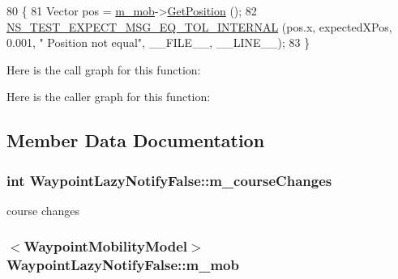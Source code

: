 \begin{DoxyCode}
80 \{
81   Vector pos = \hyperlink{classWaypointLazyNotifyFalse_acf8bb7f07cba4da3d83bab7bcc97094a}{m\_mob}->\hyperlink{classns3_1_1MobilityModel_aba838f06ec5bbb2d193d94b8c0e4abb4}{GetPosition} ();
82   \hyperlink{group__testingimpl_ga831cf7f3b988d2759f9c1b72f0a1bd5c}{NS\_TEST\_EXPECT\_MSG\_EQ\_TOL\_INTERNAL} (pos.x, expectedXPos, 0.001, \textcolor{stringliteral}{"
      Position not equal"}, \_\_FILE\_\_, \_\_LINE\_\_);
83 \}
\end{DoxyCode}


Here is the call graph for this function\+:




Here is the caller graph for this function\+:




\subsection{Member Data Documentation}
\subsubsection[{\texorpdfstring{m\+\_\+course\+Changes}{m_courseChanges}}]{\setlength{\rightskip}{0pt plus 5cm}int Waypoint\+Lazy\+Notify\+False\+::m\+\_\+course\+Changes\hspace{0.3cm}{\ttfamily [private]}}\hypertarget{classWaypointLazyNotifyFalse_a78f52b3733698debc6d133982de7ea56}{}\label{classWaypointLazyNotifyFalse_a78f52b3733698debc6d133982de7ea56}


course changes 

\subsubsection[{\texorpdfstring{m\+\_\+mob}{m_mob}}]{$<${\bf Waypoint\+Mobility\+Model}$>$ Waypoint\+Lazy\+Notify\+False\+::m\+\_\+mob\hspace{0.3cm}{\ttfamily [private]}}\hypertarget{classWaypointLazyNotifyFalse_acf8bb7f07cba4da3d83bab7bcc97094a}{}\label{classWaypointLazyNotifyFalse_acf8bb7f07cba4da3d83bab7bcc97094a}


